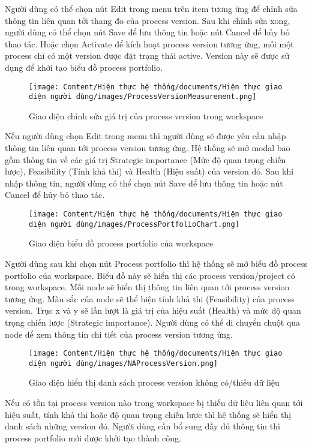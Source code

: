 Người dùng có thể chọn nút Edit trong menu trên item tương ứng để chỉnh sửa thông tin liên quan tới thang đo của process version. Sau khi chỉnh sửa xong, người dùng có thể chọn nút Save để lưu thông tin hoặc nút Cancel để hủy bỏ thao tác. Hoặc chọn Activate để kích hoạt process version tương ứng, mỗi một process chỉ có một version được đặt trạng thái active. Version này sẽ được sử dụng để khởi tạo biểu đồ process portfolio.

\begin{figure}[H]
    \centering
    \texttt{[image: Content/Hiện thực hệ thống/documents/Hiện thực giao diện người dùng/images/ProcessVersionMeasurement.png]}
    \vspace{0.5cm}
    \caption{Giao diện chỉnh sửa giá trị của process version trong workspace}
    \label{fig: Giao diện chỉnh sửa giá trị của process version trong workspace}
\end{figure}

Nếu người dùng chọn Edit trong menu thì người dùng sẽ được yêu cầu nhập thông tin liên quan tới process version tương ứng. Hệ thống sẽ mở modal bao gồm thông tin về các giá trị Strategic importance (Mức độ quan trọng chiến lược), Feasibility (Tính khả thi) và Health (Hiệu suất) của version đó. Sau khi nhập thông tin, người dùng có thể chọn nút Save để lưu thông tin hoặc nút Cancel để hủy bỏ thao tác.

\begin{figure}[H]
    \centering
    \texttt{[image: Content/Hiện thực hệ thống/documents/Hiện thực giao diện người dùng/images/ProcessPortfolioChart.png]}
    \vspace{0.5cm}
    \caption{Giao diện biểu đồ process portfolio của workspace}
    \label{fig: Giao diện biểu đồ process portfolio của workspace}
\end{figure}

Người dùng sau khi chọn nút Process portfolio thì hệ thống sẽ mở biểu đồ process portfolio của workspace. Biểu đồ này sẽ hiển thị các process version/project có trong workspace. Mỗi node sẽ hiển thị thông tin liên quan tới process version tương ứng. Màu sắc của node sẽ thể hiện tính khả thi (Feasibility) của process version. Trục x và y sẽ lần lượt là giá trị của hiệu suất (Health) và mức độ quan trọng chiến lược (Strategic importance). Người dùng có thể di chuyển chuột qua node để xem thông tin chi tiết của process version tương ứng.

\begin{figure}[H]
    \centering
    \texttt{[image: Content/Hiện thực hệ thống/documents/Hiện thực giao diện người dùng/images/NAProcessVersion.png]}
    \vspace{0.5cm}
    \caption{Giao diện hiển thị danh sách process version không có/thiếu dữ liệu}
    \label{fig: Giao diện hiển thị danh sách process version không có/thiếu dữ liệu}
\end{figure}

Nếu có tồn tại process version nào trong workspace bị thiếu dữ liệu liên quan tới hiệu suất, tính khả thi hoặc độ quan trọng chiến lược thì hệ thống sẽ hiển thị danh sách những version đó. Người dùng cần bổ sung đầy đủ thông tin thì process portfolio mới được khởi tạo thành công.
